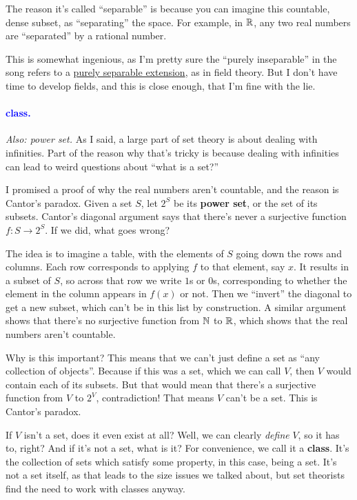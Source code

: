 \documentclass[11pt,paper=letter]{scrartcl}
\renewcommand{\bluebf}[1]{{\bfseries \color{Blue} #1}}
\renewcommand\wp[1]{\paragraph{\textcolor{Blue}{#1.}} \hspace{-1em}}
\newcommand\wl[1]{\label{w:#1}}
\newcommand\oww[1]{\textit{Also: #1.}}
\begin{document}
\begin{remboxed}
  The reason it's called ``separable'' is because you can imagine this countable, dense subset, as ``separating'' the space. For example, in $\mathbb R$, any two real numbers are ``separated'' by a rational number.
\end{remboxed}

\begin{remboxed}
  This is somewhat ingenious, as I'm pretty sure the ``purely inseparable'' in the song refers to a \href{https://en.wikipedia.org/wiki/Purely_inseparable_extension}{purely separable extension}, as in field theory. But I don't have time to develop fields, and this is close enough, that I'm fine with the lie.
\end{remboxed}

\wp{class}
\wl{class}
\oww{power set}
As I said, a large part of set theory is about dealing with infinities. Part of the reason why that's tricky is because dealing with infinities can lead to weird questions about ``what is a set?''

I promised a proof of why the real numbers aren't countable, and the reason is Cantor's paradox. Given a set $S$, let $2^S$ be its \textbf{power set}, or the set of its subsets. Cantor's diagonal argument says that there's never a surjective function $f : S \to 2^S$. If we did, what goes wrong?

The idea is to imagine a table, with the elements of $S$ going down the rows and columns. Each row corresponds to applying $f$ to that element, say $x$. It results in a subset of $S$, so across that row we write $1$s or $0$s, corresponding to whether the element in the column appears in $f(x)$ or not. Then we ``invert'' the diagonal to get a new subset, which can't be in this list by construction. A similar argument shows that there's no surjective function from $\mathbb N$ to $\mathbb R$, which shows that the real numbers aren't countable.

Why is this important? This means that we can't just define a set as ``any collection of objects''. Because if this was a set, which we can call $V$, then $V$ would contain each of its subsets. But that would mean that there's a surjective function from $V$ to $2^V$, contradiction! That means $V$ can't be a set. This is Cantor's paradox.

If $V$ isn't a set, does it even exist at all? Well, we can clearly \textit{define} $V$, so it has to, right? And if it's not a set, what is it? For convenience, we call it a \bluebf{class}. It's the collection of sets which satisfy some property, in this case, being a set. It's not a set itself, as that leads to the size issues we talked about, but set theorists find the need to work with classes anyway.
\end{document}
